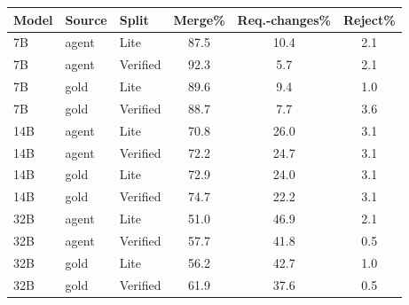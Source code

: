 \begin{tabular}{lll ccc}
\toprule
Model & Source & Split & Merge\% & Req.-changes\% & Reject\% \\
\midrule
7B & agent & Lite & 87.5 & 10.4 & 2.1 \\
7B & agent & Verified & 92.3 & 5.7 & 2.1 \\
7B & gold & Lite & 89.6 & 9.4 & 1.0 \\
7B & gold & Verified & 88.7 & 7.7 & 3.6 \\
\midrule
14B & agent & Lite & 70.8 & 26.0 & 3.1 \\
14B & agent & Verified & 72.2 & 24.7 & 3.1 \\
14B & gold & Lite & 72.9 & 24.0 & 3.1 \\
14B & gold & Verified & 74.7 & 22.2 & 3.1 \\
\midrule
32B & agent & Lite & 51.0 & 46.9 & 2.1 \\
32B & agent & Verified & 57.7 & 41.8 & 0.5 \\
32B & gold & Lite & 56.2 & 42.7 & 1.0 \\
32B & gold & Verified & 61.9 & 37.6 & 0.5 \\
\bottomrule
\end{tabular}
